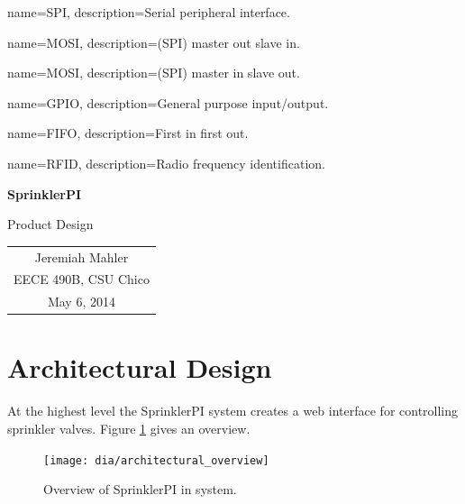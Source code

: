 \documentclass{article}
\begin{document}

{
	name={SPI},
	description={Serial peripheral interface}.
}

{
	name={MOSI},
	description={(SPI) master out slave in}.
}

{
	name={MOSI},
	description={(SPI) master in slave out}.
}

{
	name={GPIO},
	description={General purpose input/output}.
}

{
	name={FIFO},
	description={First in first out}.
}

{
	name={RFID},
	description={Radio frequency identification}.
}



\vspace*{1.0in}

\centerline{\LARGE \textbf{SprinklerPI}}
\vspace{0.3in}
\centerline{\LARGE Product Design}

\vfill

\begin{center}
\begin{tabular}{c}
Jeremiah Mahler \\
EECE 490B, CSU Chico \\
May 6, 2014
\end{tabular}
\end{center}

\vspace{2in}

\thispagestyle{empty}

\pagebreak

\nocite{rasberrypi}
\thispagestyle{empty}
\tableofcontents

\clearpage
\section{Architectural Design}

At the highest level the SprinklerPI system creates a web interface
for controlling sprinkler valves.
Figure \ref{fig:archoview} gives an overview.

\begin{figure}[h!]
\begin{center}
\texttt{[image: dia/architectural\_overview]}
\end{center}
\caption{Overview of SprinklerPI in system.}
\label{fig:archoview}
\end{figure}
\end{document}
